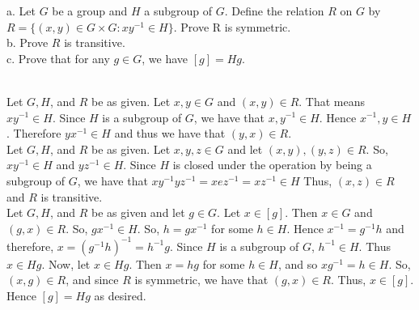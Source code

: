 a. Let $G$ be a group and $H$ a subgroup of $G$. Define the relation $R$ on $G$ by
$R=\{(x,y)\in G\times G:xy^{-1}\in H\}$. Prove R is symmetric.\\

b. Prove $R$ is transitive.\\

c. Prove that for any $g\in G$, we have $[g]=Hg$.\\

\begin{solution}\renewcommand{\qedsymbol}{}\ \\
    Let $G, H$, and $R$ be as given. Let $x,y\in G$ and $(x,y)\in R$. That means $xy^{-1}\in H$. Since
    $H$ is a subgroup of $G$, we have that $x,y^{-1}\in H$. Hence $x^{-1},y\in H$. Therefore
    $yx^{-1}\in H$ and thus we have that $(y,x)\in R$.\\

    Let $G, H$, and $R$ be as given. Let $x,y,z\in G$ and let $(x,y),(y,z)\in R$. So, $xy^{-1}\in H$ and
    $yz^{-1}\in H$. Since $H$ is closed under the operation by being a subgroup of $G$, we have that
    $xy^{-1}yz^{-1}=xez^{-1}=xz^{-1}\in H$ Thus, $(x,z)\in R$ and $R$ is transitive.\\

    Let $G, H$, and $R$ be as given and let $g\in G$. Let $x\in [g]$. Then $x\in G$ and $(g,x)\in R$.
    So, $gx^{-1}\in H$. So, $h=gx^{-1}$ for some $h\in H$. Hence $x^{-1}=g^{-1}h$ and therefore,
    $x=(g^{-1}h)^{-1}=h^{-1}g$. Since $H$ is a subgroup of $G$, $h^{-1}\in H$. Thus $x\in Hg$. Now, let
    $x\in Hg$. Then $x=hg$ for some $h\in H$, and so $xg^{-1}=h\in H$. So, $(x,g)\in R$, and since $R$
    is symmetric, we have that $(g,x)\in R$. Thus, $x\in [g]$. Hence $[g]=Hg$ as desired.

\end{solution}